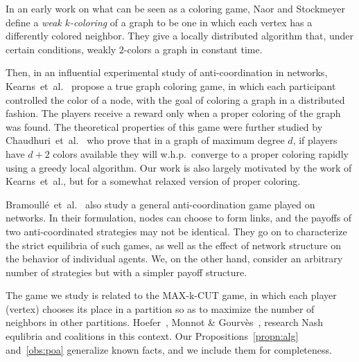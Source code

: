 \documentclass{llncs}
\begin{document}
In an early work on what can be seen as a coloring game, Naor and
Stockmeyer~\cite{NaorS93} define a \emph{weak $k$-coloring} of a graph to be
one in which each vertex has a differently colored neighbor.
They give a locally distributed algorithm that, under certain
conditions, weakly $2$-colors a graph in constant time. 

Then, in an influential experimental study of anti-coordination in networks,
Kearns~et~al.~\cite{KearnsSM06} propose a true graph coloring game, in which
each participant controlled the color of a node, with the goal of coloring a
graph in a distributed fashion.  The players receive a reward only when a
proper coloring of the graph was found.  The theoretical properties of this
game were further studied by Chaudhuri~et~al.~\cite{ChaudhuriGJ08} who prove
that in a graph of maximum degree $d$, if players have $d + 2$ colors available
they will w.h.p.\ converge to a proper coloring rapidly using a greedy local
algorithm.  Our work is also largely motivated by the work of Kearns~et~al.,
but for a somewhat relaxed version of proper coloring.

Bramoull\'{e}~et~al.~\cite{BramoulleLGV04} also study a general
anti-coordination game played on networks.  In their formulation, nodes can
choose to form links, and the payoffs of two anti-coordinated strategies
may not be identical.  They go on to characterize the strict equilibria of such
games, as well as the effect of network structure on the behavior of individual
agents.  We, on the other hand, consider an arbitrary number of strategies but
with a simpler payoff structure.



The game we study is related to the MAX-k-CUT game, in which
each player (vertex) chooses its place in a partition so as to maximize the
number of neighbors in other partitions. Hoefer~\cite{Hoefer2007}, Monnot \&
Gourv\`es~\cite{G09}, research Nash equlibria and coalitions in this
context. Our Propositions~\ref{propn:alg} and~\ref{obs:poa}
generalize known facts, and we include them for completeness.
\end{document}
